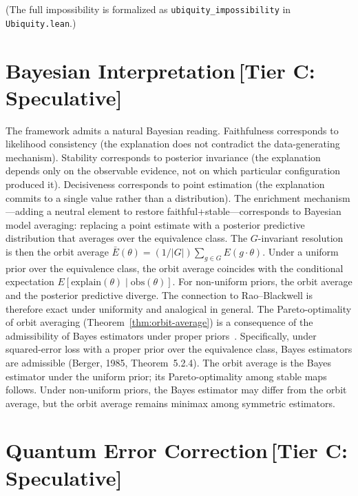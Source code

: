 \documentclass[11pt,a4paper]{article}
\begin{document}
(The full impossibility is formalized as \texttt{ubiquity\_impossibility}
in \texttt{Ubiquity.lean}.)

\section{Bayesian Interpretation\,\textnormal{\normalsize[Tier C: Speculative]}}
\label{sec:bridge-bayesian}

The framework admits a natural Bayesian reading.  Faithfulness corresponds to likelihood consistency (the explanation does not contradict the data-generating mechanism).  Stability corresponds to posterior invariance (the explanation depends only on the observable evidence, not on which particular configuration produced it).  Decisiveness corresponds to point estimation (the explanation commits to a single value rather than a distribution).  The enrichment mechanism---adding a neutral element to restore faithful+stable---corresponds to Bayesian model averaging: replacing a point estimate with a posterior predictive distribution that averages over the equivalence class.  The $G$-invariant resolution is then the orbit average $\bar{E}(\theta) = (1/|G|) \sum_{g \in G} E(g \cdot \theta)$.  Under a uniform prior over the equivalence class, the orbit average coincides with the conditional expectation $E[\mathrm{explain}(\theta) \mid \mathrm{obs}(\theta)]$. For non-uniform priors, the orbit average and the posterior predictive diverge. The connection to Rao--Blackwell is therefore exact under uniformity and analogical in general.  The Pareto-optimality of orbit averaging (Theorem~\ref{thm:orbit-average}) is a consequence of the admissibility of Bayes estimators under proper priors~\citep{berger1985statistical}.  Specifically, under squared-error loss with a proper prior over the equivalence class, Bayes estimators are admissible (Berger, 1985, Theorem~5.2.4). The orbit average is the Bayes estimator under the uniform prior; its Pareto-optimality among stable maps follows. Under non-uniform priors, the Bayes estimator may differ from the orbit average, but the orbit average remains minimax among symmetric estimators.

\section{Quantum Error Correction\,\textnormal{\normalsize[Tier C: Speculative]}}
\label{sec:bridge-qec}
\end{document}
